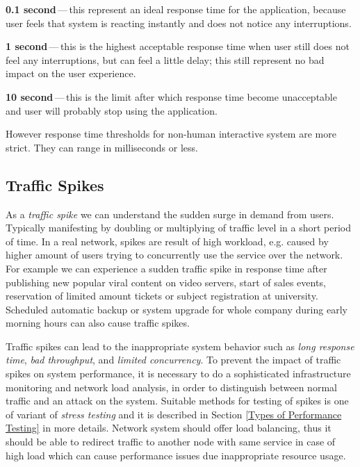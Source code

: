 \begin{description}
	\setlength\itemsep{0em}
	\item \textbf{0.1 second}\,---\,this represent an ideal response time for the application, because user feels that system is reacting instantly and does not notice any interruptions.
	\item \textbf{1 second}\,---\,this is the highest acceptable response time when user still does not feel any interruptions, but can feel a little delay; this still represent no bad impact on the user experience.
	\item \textbf{10 second}\,---\,this is the limit after which response time become unacceptable and user will probably stop using the application.
\end{description}

However response time thresholds for non-human interactive system are more strict. They can range in milliseconds or less.


\subsection*{Traffic Spikes}
As a \emph{traffic spike} \cite{Kurkova:Thesis:2017, AMC:SPIKES} we can understand the sudden surge in demand from users. Typically manifesting by doubling or multiplying of traffic level in a short period of time. In a real network, spikes are result of high workload, e.g. caused by higher amount of users trying to concurrently use the service over the network. For example we can experience a sudden traffic spike in response time after publishing new popular viral content on video servers, start of sales events, reservation of limited amount tickets or subject registration at university. Scheduled automatic backup or system upgrade for whole company during early morning hours can also cause traffic spikes.

Traffic spikes can lead to the inappropriate system behavior such as \emph{long response time}, \emph{bad throughput}, and \emph{limited concurrency}. To prevent the impact of traffic spikes on system performance, it is necessary to do a sophisticated infrastructure monitoring and network load analysis, in order to distinguish between normal traffic and an attack on the system. Suitable methods for testing of spikes is one of variant of \emph{stress testing} \cite{Manzor:APTB} and it is described in Section \ref{Types of Performance Testing} in more details. Network system should offer load balancing, thus it should be able to redirect traffic to another node with same service in case of high load which can cause performance issues due inappropriate resource usage.

